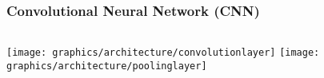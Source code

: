


\begin{frame}
    \frametitle{Convolutional Neural Network (CNN)}
    \begin{columns}
         {\texttt{[image: graphics/architecture/convolutionlayer]}}
         {\texttt{[image: graphics/architecture/poolinglayer]}}
    \end{columns}

\end{frame}

